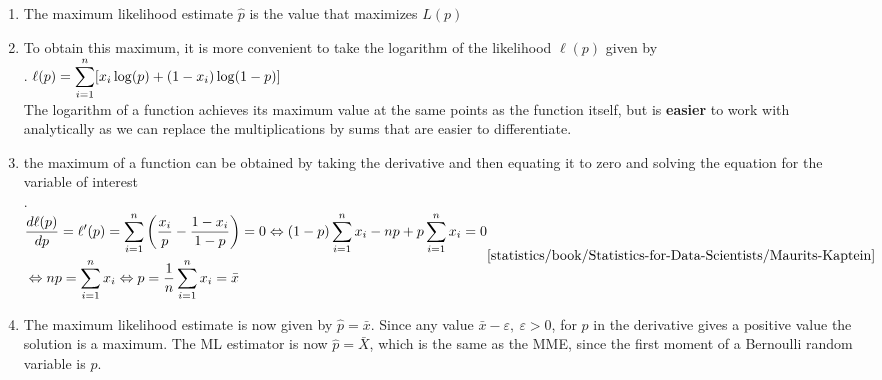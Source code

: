\begin{enumerate}
    \item The maximum likelihood estimate $\hat{p}$ is the value that maximizes $L ( p)$
    \hfill \cite{statistics/book/Statistics-for-Data-Scientists/Maurits-Kaptein}

    \item To obtain this maximum, it is more convenient to take the logarithm of the likelihood $\ell( p)$ given by
    \hfill \cite{statistics/book/Statistics-for-Data-Scientists/Maurits-Kaptein}
    \\
    .\hfill
    $
         \ell(p)
         = \displaystyle\sum ^n _{i=1} [x _i \log ( p) + (1 - x_ i ) \log (1 - p)]
    $
    \hfill \cite{statistics/book/Statistics-for-Data-Scientists/Maurits-Kaptein}
    \\
    The logarithm of a function achieves its maximum value at the same points as the function itself, but is \textbf{easier} to work with analytically as we can replace the multiplications by sums that are easier to differentiate.
    \hfill \cite{statistics/book/Statistics-for-Data-Scientists/Maurits-Kaptein}

    \item the maximum of a function can be obtained by taking the derivative and then equating it to zero and solving the equation for the variable of interest
    \hfill \cite{statistics/book/Statistics-for-Data-Scientists/Maurits-Kaptein}
    \\[0.2cm]
    .\hfill
    $
        \begin{aligned}
            &\dfrac{d \ell(p)}{dp}
            = \ell^\prime ( p)
            = \dsum ^n _{i=1} \dParenBrac{\dfrac{x _i}{p} - \dfrac{1 - x_ i} {1 - p}} = 0
            \Leftrightarrow (1 - p) \dsum^n _{i=1} x_ i - np + p \dsum^n _{i=1} x_ i = 0 \\
            &\Leftrightarrow np = \dsum^n _{i=1} x_ i
            \Leftrightarrow p = \dfrac{1}{n} \dsum^n _{i=1} x_ i = \bar{x}
        \end{aligned}
        \hfill \text{\cite{statistics/book/Statistics-for-Data-Scientists/Maurits-Kaptein}}
    $

    \item The maximum likelihood estimate is now given by $\hat{p} = \bar{x}$.
    Since any value $\bar{x} - \varepsilon,\ \varepsilon > 0$, for $p$ in the derivative gives a positive value the solution is a maximum.
    The ML estimator is now $\hat{p} = \bar{X}$, which is the same as the MME, since the first moment of a Bernoulli random variable is $p$.
    \hfill \cite{statistics/book/Statistics-for-Data-Scientists/Maurits-Kaptein}


\end{enumerate}



















